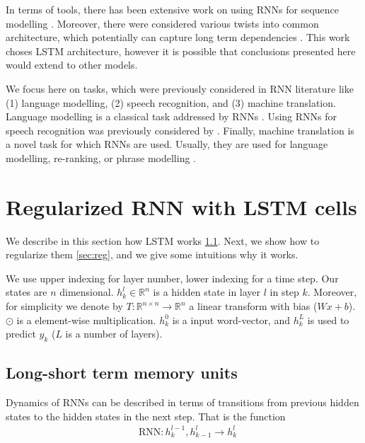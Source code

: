 \documentclass{article}
\begin{document}
In terms of tools, there has been extensive work on using RNNs for sequence modelling
\cite{mikolov2012statistical, sutskever2013training}. Moreover, there were
considered various twists into common architecture, which 
potentially can capture long term dependencies \cite{hochreiter1997long, graves2009novel, cho2014learning}. 
This work choses LSTM architecture, however it is possible that conclusions 
presented here would extend to other models. 


We focus here on tasks, which were previously considered in RNN literature like (1)
language modelling, (2) speech recognition, and (3) machine translation. 
Language modelling is a classical task addressed by
RNNs \cite{pascanu2013construct, mikolov2010recurrent, mikolov2011strategies}.
Using RNNs for speech recognition was previously 
considered by \cite{robinson1996use, graves2013speech}. Finally, machine translation
is a novel task for which RNNs are used. Usually, they are used for language modelling, 
re-ranking, or phrase modelling \cite{cho2014learning}.

\section{Regularized RNN with LSTM cells}

We describe in this section how LSTM works \ref{sec:lstm}. Next, 
we show how to regularize them \ref{sec:reg}, and we give some intuitions
why it works.


We use upper indexing for layer number, lower indexing for a time step. 
Our states are $n$ dimensional.
$h^l_k \in \mathbb{R}^{n}$ is a hidden state in layer $l$ in step $k$. Moreover, for simplicity
we denote by $T:\mathbb{R}^{n \times n} \rightarrow \mathbb{R}^{n}$ a 
linear transform with bias ($Wx + b$).
$\odot$ is a element-wise multiplication. $h^0_k$ is a input word-vector, 
and $h^{L}_k$ is used to predict $y_k$ ($L$ is a number of layers).


\subsection{Long-short term memory units}
\label{sec:lstm}

Dynamics of RNNs can be described in terms of transitions
from previous hidden states to the hidden states in the next step. 
That is the function 
\begin{align*}
  &\text{RNN} : h^{l-1}_k, h^l_{k-1} \rightarrow h^l_k
\end{align*}
\end{document}

